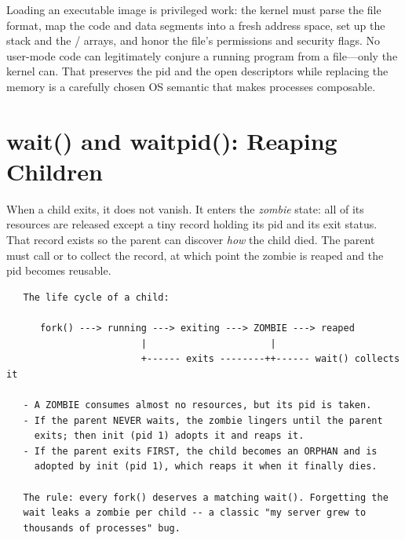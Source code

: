 \begin{osconcept}
Loading an executable image is privileged work: the kernel must parse
the file format, map the code and data segments into a fresh address
space, set up the stack and the / arrays, and
honor the file's permissions and security flags. No user-mode code can
legitimately conjure a running program from a file---only the kernel
can. That  preserves the pid and the open descriptors while
replacing the memory is a carefully chosen OS semantic that makes
processes composable.
\end{osconcept}

\section{wait() and waitpid(): Reaping Children}

When a child exits, it does not vanish. It enters the \emph{zombie}
state: all of its resources are released except a tiny record holding
its pid and its exit status. That record exists so the parent can
discover \emph{how} the child died. The parent must call
 or  to collect the record, at which point
the zombie is reaped and the pid becomes reusable.

\begin{verbatim}
   The life cycle of a child:

      fork() ---> running ---> exiting ---> ZOMBIE ---> reaped
                        |                      |
                        +------ exits --------++------ wait() collects it

   - A ZOMBIE consumes almost no resources, but its pid is taken.
   - If the parent NEVER waits, the zombie lingers until the parent
     exits; then init (pid 1) adopts it and reaps it.
   - If the parent exits FIRST, the child becomes an ORPHAN and is
     adopted by init (pid 1), which reaps it when it finally dies.

   The rule: every fork() deserves a matching wait(). Forgetting the
   wait leaks a zombie per child -- a classic "my server grew to
   thousands of processes" bug.
\end{verbatim}

